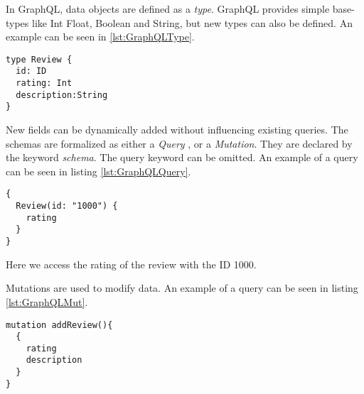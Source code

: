 In GraphQL, data objects are defined as a \emph{type}. GraphQL provides simple base-types like Int Float, Boolean and String, but new types can also be defined. An example can be seen in \ref{lst:GraphQLType}.
\begin{lstlisting}[caption={Example of a GraphQL schema},captionpos=b,label={lst:GraphQLType}]
type Review {
  id: ID
  rating: Int
  description:String
}
\end{lstlisting}
New fields can be dynamically added without influencing existing queries. The schemas are formalized as either a \emph{Query }, or a \emph{Mutation}. They are declared by the keyword \emph{schema}. The query keyword can be omitted. An example of a query can be seen in listing \ref{lst:GraphQLQuery}.
\begin{lstlisting}[caption={Example of a GraphQL Query},captionpos=b,label={lst:GraphQLQuery}]
{
  Review(id: "1000") {
    rating
  }
}
\end{lstlisting}
Here we access the rating of the review with the ID 1000.

Mutations are used to modify data. An example of a query can be seen in listing \ref{lst:GraphQLMut}.
\begin{lstlisting}[caption={Example of a GraphQL Mutation},captionpos=b,label={lst:GraphQLMut}]
mutation addReview(){
  {
	rating 
	description
  }
}
\end{lstlisting}
